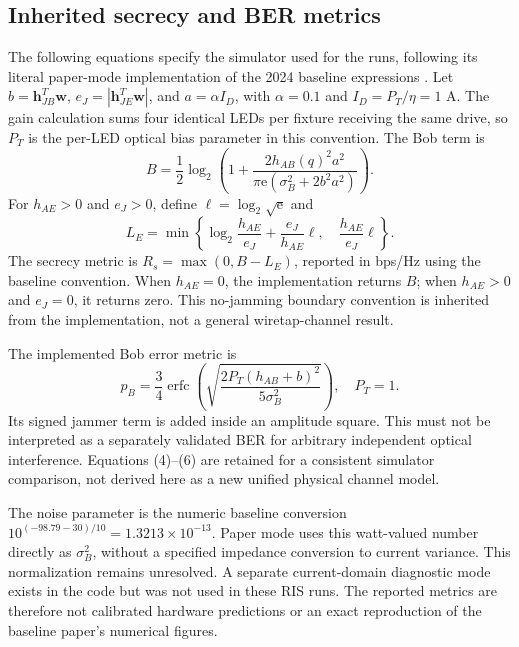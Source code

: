 \documentclass[journal,10pt,twocolumn]{IEEEtran}
\begin{document}
\subsection{Inherited secrecy and BER metrics}
The following equations specify the simulator used for the runs, following its literal paper-mode implementation of the 2024 baseline expressions \cite{liu2024smart}. Let $b=\mathbf{h}_{JB}^{T}\mathbf{w}$, $e_J=|\mathbf{h}_{JE}^{T}\mathbf{w}|$, and $a=\alpha I_D$, with $\alpha=0.1$ and $I_D=P_T/\eta=1$ A. The gain calculation sums four identical LEDs per fixture receiving the same drive, so $P_T$ is the per-LED optical bias parameter in this convention. The Bob term is
\begin{equation}
B=\frac12\log_2\!\left(1+
\frac{2h_{AB}(q)^2a^2}{\pi\mathrm e(\sigma_B^2+2b^2a^2)}\right).

\end{equation}
For $h_{AE}>0$ and $e_J>0$, define $\ell=\log_2\sqrt{\mathrm e}$ and
\begin{equation}
L_E=\min\!\left\{\log_2\frac{h_{AE}}{e_J}
+\frac{e_J}{h_{AE}}\ell,\quad\frac{h_{AE}}{e_J}\ell\right\}.

\end{equation}
The secrecy metric is $R_s=\max(0,B-L_E)$, reported in bps/Hz using the baseline convention. When $h_{AE}=0$, the implementation returns $B$; when $h_{AE}>0$ and $e_J=0$, it returns zero. This no-jamming boundary convention is inherited from the implementation, not a general wiretap-channel result.

The implemented Bob error metric is
\begin{equation}
p_B=\frac34\operatorname{erfc}\!\left(
\sqrt{\frac{2P_T(h_{AB}+b)^2}{5\sigma_B^2}}\right),\quad P_T=1.

\end{equation}
Its signed jammer term is added inside an amplitude square. This must not be interpreted as a separately validated BER for arbitrary independent optical interference. Equations (4)--(6) are retained for a consistent simulator comparison, not derived here as a new unified physical channel model.

The noise parameter is the numeric baseline conversion $10^{(-98.79-30)/10}=1.3213\times10^{-13}$. Paper mode uses this watt-valued number directly as $\sigma_B^2$, without a specified impedance conversion to current variance. This normalization remains unresolved. A separate current-domain diagnostic mode exists in the code but was not used in these RIS runs. The reported metrics are therefore not calibrated hardware predictions or an exact reproduction of the baseline paper's numerical figures.
\end{document}
